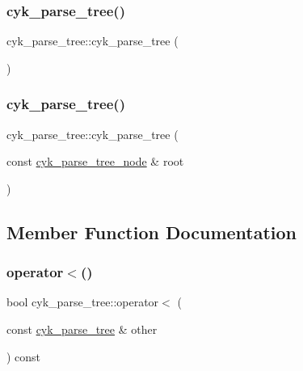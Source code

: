 \subsubsection{\texorpdfstring{cyk\_parse\_tree()}{cyk\_parse\_tree()}\hspace{0.1cm}{\footnotesize\ttfamily [1/2]}}
{\footnotesize\ttfamily cyk\+\_\+parse\+\_\+tree\+::cyk\+\_\+parse\+\_\+tree (\begin{DoxyParamCaption}{ }\end{DoxyParamCaption})\hspace{0.3cm}{\ttfamily [inline]}}

\mbox{\label{classcyk__parse__tree_a1a48d0b179ecf9bf9e438a4985c65143}} 
\subsubsection{\texorpdfstring{cyk\_parse\_tree()}{cyk\_parse\_tree()}\hspace{0.1cm}{\footnotesize\ttfamily [2/2]}}
{\footnotesize\ttfamily cyk\+\_\+parse\+\_\+tree\+::cyk\+\_\+parse\+\_\+tree (\begin{DoxyParamCaption}\item[{const \mbox{\hyperlink{classcyk__parse__tree__node}{cyk\+\_\+parse\+\_\+tree\+\_\+node}} \&}]{root }\end{DoxyParamCaption})\hspace{0.3cm}{\ttfamily [inline]}}



\subsection{Member Function Documentation}
\mbox{\label{classcyk__parse__tree_a886b5d6cd5f1e501fb9201f8bf00cd88}} 
\subsubsection{\texorpdfstring{operator$<$()}{operator<()}}
{\footnotesize\ttfamily bool cyk\+\_\+parse\+\_\+tree\+::operator$<$ (\begin{DoxyParamCaption}\item[{const \mbox{\hyperlink{classcyk__parse__tree}{cyk\+\_\+parse\+\_\+tree}} \&}]{other }\end{DoxyParamCaption}) const\hspace{0.3cm}{\ttfamily [inline]}}

